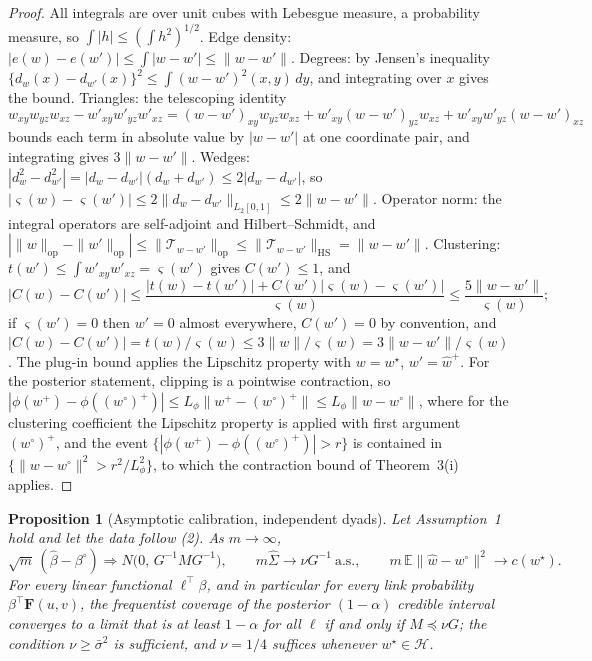 \documentclass[12pt]{article}
\newcommand{\E}{\mathbb{E}}
\newcommand{\calH}{\mathcal{H}}
\newcommand{\norm}[1]{\|#1\|}
\newcommand{\wstar}{w^{\star}}
\newcommand{\wproj}{w^{\circ}}
\newcommand{\bproj}{\beta^{\circ}}
\newcommand{\what}{\hat w}
\newcommand{\whatp}{\hat w^{+}}
\newcommand{\bhat}{\hat\beta}
\newcommand{\Sighat}{\hat\Sigma}
\newcommand{\Fv}{\mathbf{F}}
\newtheorem{propositionS}{Proposition}
\begin{document}
\begin{proof}
All integrals are over unit cubes with Lebesgue measure, a probability measure, so $\int|h|\le(\int h^2)^{1/2}$. Edge density: $|e(w)-e(w')|\le\int|w-w'|\le\norm{w-w'}$. Degrees: by Jensen's inequality $\{d_w(x)-d_{w'}(x)\}^2\le\int(w-w')^2(x,y)\,dy$, and integrating over $x$ gives the bound. Triangles: the telescoping identity
\[
w_{xy}w_{yz}w_{xz}-w'_{xy}w'_{yz}w'_{xz}=(w-w')_{xy}w_{yz}w_{xz}+w'_{xy}(w-w')_{yz}w_{xz}+w'_{xy}w'_{yz}(w-w')_{xz}
\]
bounds each term in absolute value by $|w-w'|$ at one coordinate pair, and integrating gives $3\norm{w-w'}$. Wedges: $|d_w^2-d_{w'}^2|=|d_w-d_{w'}|(d_w+d_{w'})\le2|d_w-d_{w'}|$, so $|\varsigma(w)-\varsigma(w')|\le2\norm{d_w-d_{w'}}_{L_2[0,1]}\le2\norm{w-w'}$. Operator norm: the integral operators are self-adjoint and Hilbert--Schmidt, and $|\norm w_{\mathrm{op}}-\norm{w'}_{\mathrm{op}}|\le\norm{\mathcal{T}_{w-w'}}_{\mathrm{op}}\le\norm{\mathcal{T}_{w-w'}}_{\mathrm{HS}}=\norm{w-w'}$. Clustering: $t(w')\le\int w'_{xy}w'_{xz}=\varsigma(w')$ gives $C(w')\le1$, and
\[
|C(w)-C(w')|\le\frac{|t(w)-t(w')|+C(w')|\varsigma(w)-\varsigma(w')|}{\varsigma(w)}\le\frac{5\norm{w-w'}}{\varsigma(w)};
\]
if $\varsigma(w')=0$ then $w'=0$ almost everywhere, $C(w')=0$ by convention, and $|C(w)-C(w')|=t(w)/\varsigma(w)\le3\norm{w}/\varsigma(w)=3\norm{w-w'}/\varsigma(w)$. The plug-in bound applies the Lipschitz property with $w=\wstar$, $w'=\whatp$. For the posterior statement, clipping is a pointwise contraction, so $|\phi(w^{+})-\phi((\wproj)^{+})|\le L_\phi\norm{w^{+}-(\wproj)^{+}}\le L_\phi\norm{w-\wproj}$, where for the clustering coefficient the Lipschitz property is applied with first argument $(\wproj)^{+}$, and the event $\{|\phi(w^{+})-\phi((\wproj)^{+})|>r\}$ is contained in $\{\norm{w-\wproj}^2>r^2/L_\phi^2\}$, to which the contraction bound of Theorem~3(i) applies.
\end{proof}

\begin{propositionS}[Asymptotic calibration, independent dyads]
Let Assumption~1 hold and let the data follow (2). As $m\to\infty$,
\[
\sqrt m\,(\bhat-\bproj)\Rightarrow N\big(0,\,G^{-1}MG^{-1}\big),\qquad m\Sighat\to\nu G^{-1}\ \text{a.s.},\qquad m\,\E\norm{\what-\wproj}^2\to c(\wstar).
\]
For every linear functional $\ell^{\top}\beta$, and in particular for every link probability $\beta^{\top}\Fv(u,v)$, the frequentist coverage of the posterior $(1-\alpha)$ credible interval converges to a limit that is at least $1-\alpha$ for all $\ell$ if and only if $M\preceq \nu G$; the condition $\nu\ge\bar\sigma^2$ is sufficient, and $\nu=1/4$ suffices whenever $\wstar\in\calH$.
\end{propositionS}
\end{document}
